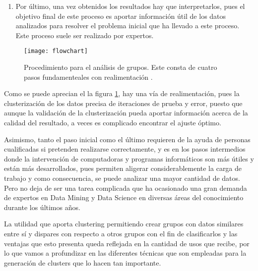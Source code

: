 \documentclass[10pt, a4paper]{article}
\begin{document}
\begin{enumerate}
  \item Por último, una vez obtenidos los resultados hay que interpretarlos, pues el objetivo final de este proceso es aportar información útil de los datos analizados para resolver el problema inicial que ha llevado a este proceso. Este proceso suele ser realizado por expertos.
\end{enumerate}

\begin{figure}[ht]
\centering
\texttt{[image: flowchart]}
\caption{Procedimiento para el análisis de grupos. Este consta de cuatro pasos fundamenteales con realimentación \cite{survey}.}
\label{fig:flowchart}
\end{figure}

Como se puede aprecian el la figura \ref{fig:flowchart}, hay una vía de realimentación, pues la clusterización de los datos precisa de iteraciones de prueba y error, puesto que aunque la validación de la clusterización pueda aportar información acerca de la calidad del resultado, a veces es complicado encontrar el ajuste óptimo.

Asimismo, tanto el paso inicial como el último requieren de la ayuda de personas cualificadas si pretenden realizarse correctamente, y es en los pasos intermedios donde la intervención de computadoras y programas informáticos son más útiles y están más desarrollados, pues permiten aligerar considerablemente la carga de trabajo y como consecuencia, se puede analizar una mayor cantidad de datos. Pero no deja de ser una tarea complicada que ha ocasionado una gran demanda de expertos en Data Mining y Data Science en diversas áreas del conocimiento durante los últimos años.

La utilidad que aporta clustering permitiendo crear grupos con datos similares entre sí y dispares con respecto a otros grupos con el fin de clasificarlos y las ventajas que esto presenta queda reflejada en la cantidad de usos que recibe, por lo que vamos a profundizar en las diferentes técnicas que son empleadas para la generación de clusters que lo hacen tan importante.


\end{document}
